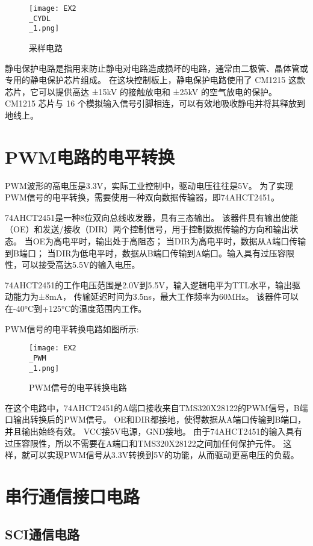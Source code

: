 \documentclass{math201}
\begin{document}
\begin{figure}[H]  
  \centering\texttt{[image: EX2\\\_CYDL\\\_1.png]}  
  \caption{采样电路}     
\end{figure}

静电保护电路是指用来防止静电对电路造成损坏的电路，通常由二极管、晶体管或专用的静电保护芯片组成。
在这块控制板上，静电保护电路使用了 CM1215 这款芯片，它可以提供高达 ±15kV 的接触放电和 ±25kV 的空气放电的保护。
CM1215 芯片与 16 个模拟输入信号引脚相连，可以有效地吸收静电并将其释放到地线上。

\section{PWM电路的电平转换}

PWM波形的高电压是3.3V，实际工业控制中，驱动电压往往是5V。
为了实现PWM信号的电平转换，需要使用一种双向数据传输器，即74AHCT2451。

74AHCT2451是一种8位双向总线收发器，具有三态输出。
该器件具有输出使能（OE）和发送/接收（DIR）两个控制信号，用于控制数据传输的方向和输出状态。
当OE为高电平时，输出处于高阻态；
当DIR为高电平时，数据从A端口传输到B端口；
当DIR为低电平时，数据从B端口传输到A端口。输入具有过压容限性，可以接受高达5.5V的输入电压。

74AHCT2451的工作电压范围是2.0V到5.5V，输入逻辑电平为TTL水平，输出驱动能力为±8mA，
传输延迟时间为3.5ns，最大工作频率为60MHz。
该器件可以在-40°C到+125°C的温度范围内工作。

PWM信号的电平转换电路如图所示:

\begin{figure}[H]  
  \centering\texttt{[image: EX2\\\_PWM\\\_1.png]}  
  \caption{PWM信号的电平转换电路}     
\end{figure}

在这个电路中，74AHCT2451的A端口接收来自TMS320X28122的PWM信号，B端口输出转换后的PWM信号。
OE和DIR都接地，使得数据从A端口传输到B端口，并且输出始终有效。
VCC接5V电源，GND接地。
由于74AHCT2451的输入具有过压容限性，所以不需要在A端口和TMS320X28122之间加任何保护元件。
这样，就可以实现PWM信号从3.3V转换到5V的功能，从而驱动更高电压的负载。

\section{串行通信接口电路}

\subsection{SCI通信电路}
\end{document}
